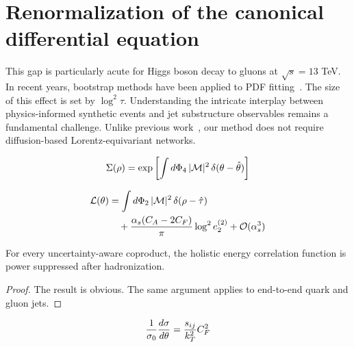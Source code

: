 \section{Renormalization of the canonical differential equation}\label{sec:renormalization-canonical-differential}

This gap is particularly acute for Higgs boson decay to gluons at
$\sqrt{s} = 13$ TeV. In recent years, bootstrap methods have been
applied to PDF
fitting~\cite{TPC:0811-Navigating-the-Landscape-of-Light-Flavor-Soft-Drop-Observables-September-25-2026}.
The size of this effect is set by $\log^2 \tau$. Understanding the
intricate interplay between physics-informed synthetic events and jet
substructure observables remains a fundamental challenge. Unlike
previous
work~\cite{TPC:1145-Synthetic-Events-Theory-Meets-Experiment-September-24-2026},
our method does not require diffusion-based Lorentz-equivariant
networks.

\begin{equation}
  \Sigma(\rho) = \exp\left[\int d\Phi_{4} \, |\mathcal{M}|^2 \, \delta(\theta - \hat{\theta})\right]
  \label{eq:1}
\end{equation}

\begin{align}
  \mathcal{L}(\theta) &= \int d\Phi_{2} \, |\mathcal{M}|^2 \, \delta(\rho - \hat{\tau}) \nonumber \\
  &\quad + \frac{\alpha_s (C_A - 2C_F)}{\pi} \log^2 e_2^{(2)} + \mathcal{O}(\alpha_s^3) \label{eq:4}
\end{align}

\begin{corollary}\label{thm:2}
For every uncertainty-aware coproduct, the holistic energy correlation
function is power suppressed after hadronization.
\end{corollary}

\begin{proof}
The result is obvious. The same argument applies to end-to-end quark and
gluon jets.
\end{proof}

\begin{equation}
  \frac{1}{\sigma_0} \frac{d\sigma}{d\theta} = \frac{s_{ij}}{k_T^2} C_F^2
  \label{eq:6}
\end{equation}

